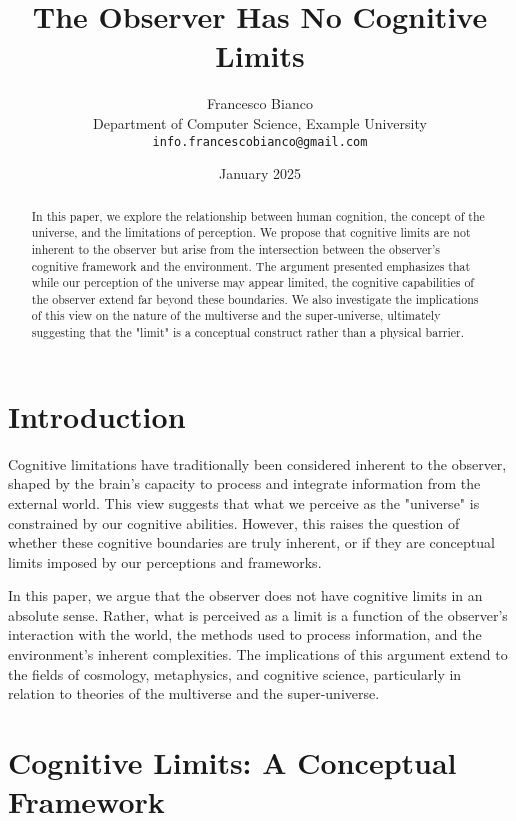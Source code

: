 \documentclass[twocolumn]{article}
\title{The Observer Has No Cognitive Limits}
\author{Francesco Bianco \\
Department of Computer Science, Example University \\
\texttt{info.francescobianco@gmail.com}}
\date{January 2025}
\begin{document}
    \maketitle

    \begin{abstract}
        In this paper, we explore the relationship between human cognition,
        the concept of the universe, and the limitations of perception.
        We propose that cognitive limits are not inherent to the observer
        but arise from the intersection between the observer's cognitive framework and the environment.
        The argument presented emphasizes that while our perception of the universe may appear limited,
        the cognitive capabilities of the observer extend far beyond these boundaries.
        We also investigate the implications of this view on the nature of the multiverse and the super-universe,
        ultimately suggesting that the "limit" is a conceptual construct rather than a physical barrier.
    \end{abstract}

    \section{Introduction}
    \label{sec:introduction}

    Cognitive limitations have traditionally been considered inherent to the observer,
    shaped by the brain's capacity to process and integrate information from the external world.
    This view suggests that what we perceive as the "universe" is constrained by our cognitive abilities.
    However, this raises the question of whether these cognitive boundaries are truly inherent,
    or if they are conceptual limits imposed by our perceptions and frameworks.

    In this paper, we argue that the observer does not have cognitive limits in an absolute sense.
    Rather, what is perceived as a limit is a function of the observer's interaction with the world,
    the methods used to process information, and the environment's inherent complexities.
    The implications of this argument extend to the fields of cosmology, metaphysics, and cognitive science,
    particularly in relation to theories of the multiverse and the super-universe.

    \lipsum[1-2]

    \section{Cognitive Limits: A Conceptual Framework}
    \label{sec:cognitive-limits:-a-conceptual-framework}
\end{document}
